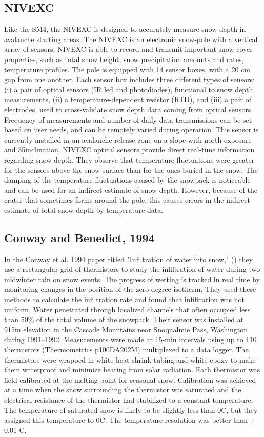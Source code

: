 \subsection{NIVEXC \cite{barbolininivexc}}  
Like the SM4, the NIVEXC is designed to accurately measure snow depth in avalanche starting areas. The NIVEXC is an electronic snow-pole with a vertical array of sensors. NIVEXC is able to record and transmit important snow cover properties, such as total snow height, snow precipitation amounts and rates, temperature profiles. The pole is equipped with 14 sensor boxes, with a 20 cm gap from one another. Each sensor box includes three different types of sensors: (i) a pair of optical sensors (IR led and photodiodes), functional to snow depth measurements, (ii) a temperature-dependent resistor (RTD), and (iii) a pair of electrodes, used to cross-validate snow depth data coming from optical sensors. Frequency of measurements and number of daily data transmissions can be set based on user needs, and can be remotely varied during operation. This sensor is currently installed in an avalanche release zone on a slope with north exposure and 35\textdegree inclination. NIVEXC optical sensors provide direct real-time information regarding snow depth. They observe that temperature fluctuations were greater for the sensors above the snow surface than for the ones buried in the snow. The damping of the temperature fluctuations caused by the snowpack is noticeable and can be used for an indirect estimate of snow depth. However, because of the crater that sometimes forms around the pole, this causes errors in the indirect estimate of total snow depth by temperature data. 

\subsection{Conway and Benedict, 1994} 
In the Conway et al. 1994 paper titled "Infiltration of water into snow," (\cite{conway_benedict_1994}) they use a rectangular grid of thermistors to study the infiltration of water during two midwinter rain on snow events. The progress of wetting is tracked in real time by monitoring changes in the position of the zero-degree isotherm. They used these methods to calculate the infiltration rate and found that infiltration was not uniform. Water penetrated through localized channels that often occupied less than 50\% of the total volume of the snowpack. Their sensor was installed at 915m elevation in the Cascade Mountains near Snoqualmie Pass, Washington during 1991--1992. Measurements were made at 15-min intervals using up to 110 thermistors (Thermometrics p100DA202M) multiplexed to a data logger. The thermistors were wrapped in white heat-shrink tubing and white epoxy to make them waterproof and minimize heating from solar radiation. Each thermistor was field calibrated at the melting point for seasonal snow. Calibration was achieved at a time when the snow surrounding the thermistor was saturated and the electrical resistance of the thermistor had stabilized to a constant temperature. The temperature of saturated snow is likely to be slightly less than 0\textdegree C, but they assigned this temperature to 0\textdegree C. The temperature resolution was better than $\pm$ 0.01 \textdegree C.
 
